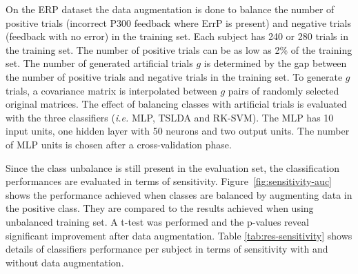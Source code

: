 On the ERP dataset the data augmentation is done to balance the number of positive trials (incorrect P300 feedback where ErrP is present) and negative trials (feedback with no error) in the training set.
Each subject has 240 or 280 trials in the training set. The number of positive trials can be as low as 2\% of the training set. %
The number of generated artificial trials $g$ is determined by the gap between the number of positive trials and negative trials in the training set. 
To generate $g$ trials, a covariance matrix is interpolated between $g$ pairs of randomly selected original matrices.
The effect of balancing classes with artificial trials is evaluated with the three classifiers (\textit{i.e.} MLP, TSLDA and RK-SVM).
The MLP has 10 input units, one hidden layer with 50 neurons and two output units. 
The number of MLP units is chosen after a cross-validation phase.

Since the class unbalance is still present in the evaluation set, the classification performances are evaluated in terms of sensitivity.
Figure~\ref{fig:sensitivity-auc} shows the performance achieved when classes are balanced by augmenting data in the positive class. 
They are compared to the results achieved when using unbalanced training set. A t-test was performed and the p-values reveal significant improvement after data augmentation. Table \ref{tab:res-sensitivity} shows details of classifiers performance per subject in terms of sensitivity with and without data augmentation.   

